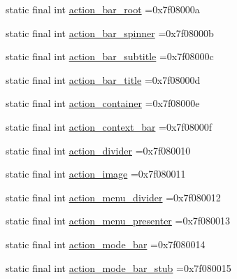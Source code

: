 \begin{DoxyCompactItemize}
\item 
static final int \mbox{\hyperlink{classcom_1_1example_1_1trainawearapplication_1_1_r_1_1id_aeefb4a79869aff14862269d0dda9da31}{action\+\_\+bar\+\_\+root}} =0x7f08000a
\item 
static final int \mbox{\hyperlink{classcom_1_1example_1_1trainawearapplication_1_1_r_1_1id_a203a88b80e0e6d86dd154f8548c00a29}{action\+\_\+bar\+\_\+spinner}} =0x7f08000b
\item 
static final int \mbox{\hyperlink{classcom_1_1example_1_1trainawearapplication_1_1_r_1_1id_a26da5c76a7b2133000ac594594f4aac5}{action\+\_\+bar\+\_\+subtitle}} =0x7f08000c
\item 
static final int \mbox{\hyperlink{classcom_1_1example_1_1trainawearapplication_1_1_r_1_1id_a4e521dea959c8f77a64127206f75c000}{action\+\_\+bar\+\_\+title}} =0x7f08000d
\item 
static final int \mbox{\hyperlink{classcom_1_1example_1_1trainawearapplication_1_1_r_1_1id_aada242315139911c63d06c69270775a9}{action\+\_\+container}} =0x7f08000e
\item 
static final int \mbox{\hyperlink{classcom_1_1example_1_1trainawearapplication_1_1_r_1_1id_a35aae732937640933ea76373444bb26e}{action\+\_\+context\+\_\+bar}} =0x7f08000f
\item 
static final int \mbox{\hyperlink{classcom_1_1example_1_1trainawearapplication_1_1_r_1_1id_aaddc23ee0947f760a5cf553f2f6076a2}{action\+\_\+divider}} =0x7f080010
\item 
static final int \mbox{\hyperlink{classcom_1_1example_1_1trainawearapplication_1_1_r_1_1id_aa63f2ad76eab91e50f3090e4e4084993}{action\+\_\+image}} =0x7f080011
\item 
static final int \mbox{\hyperlink{classcom_1_1example_1_1trainawearapplication_1_1_r_1_1id_a7d8a30de5f1ccd4334f6e6354222d591}{action\+\_\+menu\+\_\+divider}} =0x7f080012
\item 
static final int \mbox{\hyperlink{classcom_1_1example_1_1trainawearapplication_1_1_r_1_1id_aea0cfdccada4874fff19a5d4da668c51}{action\+\_\+menu\+\_\+presenter}} =0x7f080013
\item 
static final int \mbox{\hyperlink{classcom_1_1example_1_1trainawearapplication_1_1_r_1_1id_ab9483c0321cc0a5e1e3da03de7da423d}{action\+\_\+mode\+\_\+bar}} =0x7f080014
\item 
static final int \mbox{\hyperlink{classcom_1_1example_1_1trainawearapplication_1_1_r_1_1id_a83a9ca544db7e9bd1beb58bd7bbeb96e}{action\+\_\+mode\+\_\+bar\+\_\+stub}} =0x7f080015
\item 

\end{DoxyCompactItemize}
